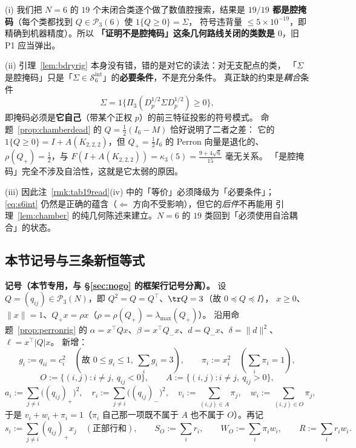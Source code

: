 \begin{remark}[这条否证的真实后果]\label{rmk:chamberdead}
(i) 我们把 $N=6$ 的 $19$ 个未闭合类逐个做了数值腔搜索，结果是
\textbf{$19/19$ 都是腔掩码}（每个类都找到 $Q\in\mathcal P_3(6)$ 使 $1\{Q\ge0\}=\Sigma$，
符号违背量 $\le5\times10^{-19}$，即精确到机器精度）。所以
\textbf{「证明不是腔掩码」这条几何路线关闭的类数是 $0$}，旧 P1 应当弹出。

(ii) 引理~\ref{lem:bdryrig} 本身没有错，错的是对它的读法：对无支配点的类，
「$\Sigma$ 是腔掩码」只是「$\Sigma\in\mathcal S_6^{\mathrm{int}}$」的\textbf{必要条件}，不是充分条件。
真正缺的约束是\emph{耦合}条件
\[
\Sigma=1\bigl\{\Pi_3(D_p^{1/2}\Sigma D_p^{1/2})\ge0\bigr\},
\]
即掩码必须是\textbf{它自己}（带某个正权 $p$）的前三特征投影的符号模式。
命题~\ref{prop:chamberdead} 的 $Q=\frac12(I_6-M)$ 恰好说明了二者之差：
它的 $1\{Q\ge0\}=I+A(K_{2,2,2})$，但 $Q_+=\frac12I_6$ 的 Perron 向量是退化的、
$\rho(Q_+)=\frac12$，与 $F(I+A(K_{2,2,2}))=\kappa_3(5)=\frac{9+4\sqrt6}{15}$ 毫无关系。
「是腔掩码」完全不涉及自洽性，这就是它太弱的原因。

(iii) 因此注~\ref{rmk:tab19read}(iv) 中的「等价」必须降级为「必要条件」；
\eqref{eq:s6int} 仍然是正确的蕴含（$\Leftarrow$ 方向不受影响），但它的\emph{后件}不再能用
引理~\ref{lem:chamber} 的纯几何陈述来建立。$N=6$ 的 $19$ 类回到「必须使用自洽耦合」的状态。
\end{remark}

\subsection{本节记号与三条新恒等式}\label{sec:rowid}

\textbf{记号（本节专用，与 \S\ref{sec:nogo} 的框架行记号分离）。}
设 $Q=(q_{ij})\in\mathcal P_3(N)$，即 $Q^2=Q=Q^\top$、$\tr Q=3$（故 $0\preceq Q\preceq I$），
$x\ge0$、$\|x\|=1$、$Q_+x=\rho x$（$\rho=\rho(Q_+)=\lambda_{\max}(Q_+)$）。
沿用命题~\ref{prop:perronrig} 的 $\alpha=x^\top Qx$、$\beta=x^\top Q_-x$、$d=Q_-x$、$\delta=\|d\|^2$、$\ell=x^\top|Q|x$。
新增：
\[
g_i:=q_{ii}=c_i^2\quad(\text{故 }0\le g_i\le1,\ \textstyle\sum_ig_i=3),\qquad
\pi_i:=x_i^2\quad(\textstyle\sum_i\pi_i=1),
\]
\[
O:=\{(i,j):i\ne j,\ q_{ij}<0\},\qquad A:=\{(i,j):i\ne j,\ q_{ij}>0\},
\]
\[
a_i:=\!\!\sum_{j\ne i}\!\bigl((q_{ij})_+\bigr)^2,\quad
r_i:=\!\!\sum_{j\ne i}\!\bigl((q_{ij})_-\bigr)^2,\quad
v_i:=\!\!\sum_{(i,j)\in A}\!\!\pi_j,\quad
w_i:=\!\!\sum_{(i,j)\in O}\!\!\pi_j,
\]
于是 $v_i+w_i+\pi_i=1$（$\pi_i$ 自己那一项既不属于 $A$ 也不属于 $O$）。再记
\[
s_i:=\sum_{j\ne i}(q_{ij})_+x_j\quad(\text{正部行和}),\qquad
S_O:=\sum_ir_i,\qquad W_O:=\sum_i\pi_iw_i,\qquad R:=\sum_ir_iw_i .
\]

